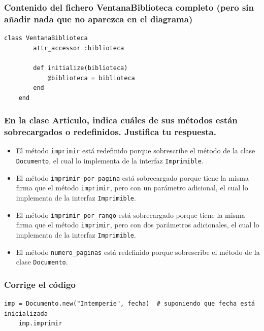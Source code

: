 \documentclass[a4paper,12pt]{article}
\begin{document}
\subsubsection*{Contenido del fichero VentanaBiblioteca completo (pero sin añadir nada que no aparezca en el diagrama)}

\begin{lstlisting}[style=customrb, caption={VentanaBiblioteca}]
    class VentanaBiblioteca
        attr_accessor :biblioteca

        def initialize(biblioteca)
            @biblioteca = biblioteca
        end
    end
\end{lstlisting}

\subsubsection*{En la clase Articulo, indica cuáles de sus métodos están sobrecargados o redefinidos. Justifica tu respuesta.}

\begin{itemize}
    \item El método \texttt{imprimir} está redefinido porque sobrescribe el método de la clase \texttt{Documento}, el cual lo implementa de la interfaz \texttt{Imprimible}.
    \item El método \texttt{imprimir\_por\_pagina} está sobrecargado porque tiene la misma firma que el método \texttt{imprimir}, pero con un parámetro adicional, el cual lo implementa de la interfaz \texttt{Imprimible}.
    \item El método \texttt{imprimir\_por\_rango} está sobrecargado porque tiene la misma firma que el método \texttt{imprimir}, pero con dos parámetros adicionales, el cual lo implementa de la interfaz \texttt{Imprimible}.
    \item El método \texttt{numero\_paginas} está redefinido porque sobrescribe el método de la clase \texttt{Documento}.
\end{itemize}

\subsubsection*{Corrige el código}

    \begin{lstlisting}[style=customrb, caption = {Código a corregir}]
    imp = Documento.new("Intemperie", fecha)  # suponiendo que fecha está inicializada
    imp.imprimir
    \end{lstlisting}
\end{document}
